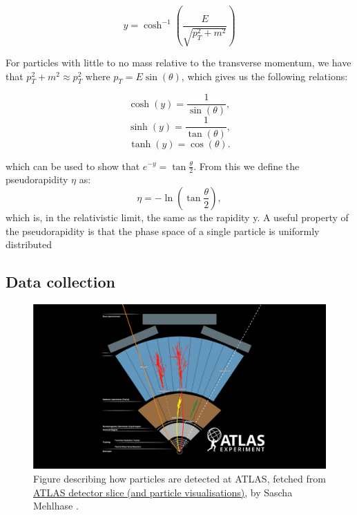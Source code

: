 \begin{equation}
    y = \cosh^{-1}\left( \frac{E}{\sqrt{p_T^2 + m^2}}\right)
\end{equation}

For particles with little to no mass relative to the transverse momentum, we have that $p_T^2 + m^2 \approx p_T^2$ 
where $p_T = E\sin{(\theta)}$, which gives us the following relations:

\begin{equation*}
    \cosh(y) = \frac{1}{\sin(\theta)},
\end{equation*}
\begin{equation*}
    \sinh(y) = \frac{1}{\tan(\theta)},
\end{equation*}
\begin{equation*}
    \tanh(y) = \cos(\theta).
\end{equation*}

which can be used to show that $e^{-y} = \tan{\frac{\theta}{2}}$. From this we define the pseudorapidity $\eta$ as:
\begin{equation}
    \eta = -\ln{\left( \tan{\frac{\theta}{2}}\right)},
\end{equation}
which is, in the relativistic limit, the same as the rapidity y. A useful property of the pseudorapidity is that 
the phase space of a single particle is uniformly distributed 
\subsection*{Data collection}

\begin{figure}[h!]
    \includegraphics[width=\linewidth]{Figures/atlas/ATLAS Detector Schematic black particles.png}
    \caption{Figure describing how particles are detected at ATLAS, fetched from \href{https://cds.cern.ch/record/2770815}{	ATLAS detector slice (and particle visualisations)}, by Sascha Mehlhase \cite{Mehlhase:2770815} . }
    \label{fig:atlas_particle_detect}
\end{figure}

